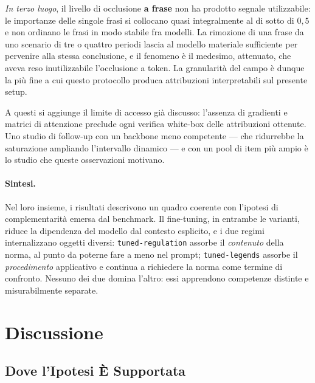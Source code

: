 \documentclass[pdflatex, sn-apa]{sn-jnl}%
\theoremstyle{thmstyleone}%
\theoremstyle{thmstyletwo}%
\theoremstyle{thmstylethree}%
\newcommand{\modellegends}{\texttt{tuned-legends}}
\newcommand{\modelreg}{\texttt{tuned-regulation}}
\begin{document}
\emph{In terzo luogo}, il livello di occlusione \textbf{a frase} non ha prodotto
segnale utilizzabile: le importanze delle singole frasi si collocano quasi
integralmente al di sotto di $0{,}5$ e non ordinano le frasi in modo stabile fra
modelli. La rimozione di una frase da uno scenario di tre o quattro periodi lascia
al modello materiale sufficiente per pervenire alla stessa conclusione, e il
fenomeno è il medesimo, attenuato, che aveva reso inutilizzabile l'occlusione a
token. La granularità del campo è dunque la più fine a cui questo protocollo
produca attribuzioni interpretabili sul presente setup.

A questi si aggiunge il limite di accesso già discusso: l'assenza di gradienti e
matrici di attenzione preclude ogni verifica white-box delle attribuzioni
ottenute. Uno studio di follow-up con un backbone meno competente --- che
ridurrebbe la saturazione ampliando l'intervallo dinamico --- e con un pool di
item più ampio è lo studio che queste osservazioni motivano.

\paragraph{Sintesi.}
Nel loro insieme, i risultati descrivono un quadro coerente con l'ipotesi di
complementarità emersa dal benchmark. Il fine-tuning, in entrambe le varianti,
riduce la dipendenza del modello dal contesto esplicito, e i due regimi
internalizzano oggetti diversi: \modelreg{} assorbe il \emph{contenuto} della
norma, al punto da poterne fare a meno nel prompt; \modellegends{} assorbe il
\emph{procedimento} applicativo e continua a richiedere la norma come termine di
confronto. Nessuno dei due domina l'altro: essi apprendono competenze distinte e
misurabilmente separate.

\FloatBarrier


\section{Discussione}
\label{sec:discussion}

\subsection{Dove l'Ipotesi È Supportata}
\label{sec:disc:supported}
\end{document}
